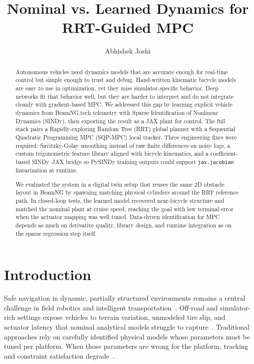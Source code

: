 \documentclass[letterpaper, 10 pt, conference]{ieeeconf}  %
\title{\LARGE \bf
Nominal vs. Learned Dynamics for RRT-Guided MPC
}
\author{Abhishek Joshi}
\begin{document}
\maketitle
\thispagestyle{empty}
\pagestyle{empty}


\begin{abstract}

Autonomous vehicles need dynamics models that are accurate enough for real-time control but simple enough to trust and debug. Hand-written kinematic bicycle models are easy to use in optimization, yet they miss simulator-specific behavior. Deep networks fit that behavior well, but they are harder to interpret and do not integrate cleanly with gradient-based MPC.
We addressed this gap by learning explicit vehicle dynamics from BeamNG.tech telemetry with Sparse Identification of Nonlinear Dynamics (SINDy), then exporting the result as a JAX plant for control. The full stack pairs a Rapidly-exploring Random Tree (RRT) global planner with a Sequential Quadratic Programming MPC (SQP-MPC) local tracker. Three engineering fixes were required: Savitzky-Golay smoothing instead of raw finite differences on noisy logs, a custom trigonometric feature library aligned with bicycle kinematics, and a coefficient-based SINDy--JAX bridge so PySINDy training outputs could support \texttt{jax.jacobian} linearization at runtime.

We evaluated the system in a digital twin setup that reuses the same 2D obstacle layout in BeamNG by spawning matching physical cylinders around the RRT reference path. In closed-loop tests, the learned model recovered near-bicycle structure and matched the nominal plant at cruise speed, reaching the goal with low terminal error when the actuator mapping was well tuned. Data-driven identification for MPC depends as much on derivative quality, library design, and runtime integration as on the sparse regression step itself.

\end{abstract}


\section{Introduction}

Safe navigation in dynamic, partially structured environments remains a central challenge in field robotics and intelligent transportation~\cite{Min2025,Wu2026,Richter2014}.
Off-road and simulator-rich settings expose vehicles to terrain variation, unmodeled tire slip, and actuator latency that nominal analytical models struggle to capture~\cite{Sathe2024,Han2024Dynamics,Bajracharya2009}.
Traditional approaches rely on carefully identified physical models whose parameters must be tuned per platform. When those parameters are wrong for the platform, tracking and constraint satisfaction degrade~\cite{LinearSysId,Sathe2024}.
\end{document}
